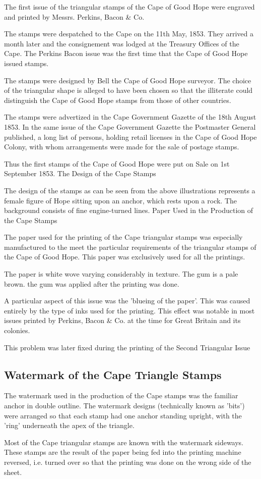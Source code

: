 The first issue of the triangular stamps of the Cape of Good Hope were engraved and printed by Messrs. Perkins, Bacon & Co.

The stamps were despatched to the Cape on the 11th May, 1853. They arrived a month later and the consignement was lodged at the Treasury Offices of the Cape. The Perkins Bacon issue was the first time that the Cape of Good Hope issued stamps.

The stamps were designed by Bell the Cape of Good Hope surveyor. The choice of the triangular shape is alleged to have been chosen so that the illiterate could distinguish the Cape of Good Hope stamps from those of other countries.

The stamps were advertized in the Cape Government Gazette of the 18th August 1853. In the same issue of the Cape Government Gazette 
the Postmaster General published, a long list of persons, holding retail licenses in the Cape of Good Hope Colony, with whom arrangements were made for the sale of postage stamps.

Thus the first stamps of the Cape of Good Hope were put on Sale on 1st September 1853.
The Design of the Cape Stamps

The design of the stamps as can be seen from the above illustrations represents a female figure of Hope sitting upon an anchor, which rests upon a rock. The background consists of fine engine-turned lines.
Paper Used in the Production of the Cape Stamps

The paper used for the printing of the Cape triangular stamps was especially manufactured to the meet the particular requirements of the triangular stamps of the Cape of Good Hope. This paper was exclusively used for all the printings.

The paper is white wove varying considerably in texture. The gum is a pale brown. the gum was applied after the printing was done.

A particular aspect of this issue was the 'blueing of the paper'. This was caused entirely by the type of inks used for the printing. This effect was notable in most issues printed by Perkins, Bacon & Co. at the time for Great Britain and its colonies.

This problem was later fixed during the printing of the Second Triangular Issue

\subsection{Watermark of the Cape Triangle Stamps
} 
The watermark used in the production of the Cape stamps was the familiar anchor in double outline. The watermark designs (technically known as 'bits') were arranged so that each stamp had one anchor standing upright, with the 'ring' underneath the apex of the triangle.

Most of the Cape triangular stamps are known with the watermark sideways. These stamps are the result of the paper being fed into the printing machine reversed, i.e. turned over so that the printing was done on the wrong side of the sheet.

 

       